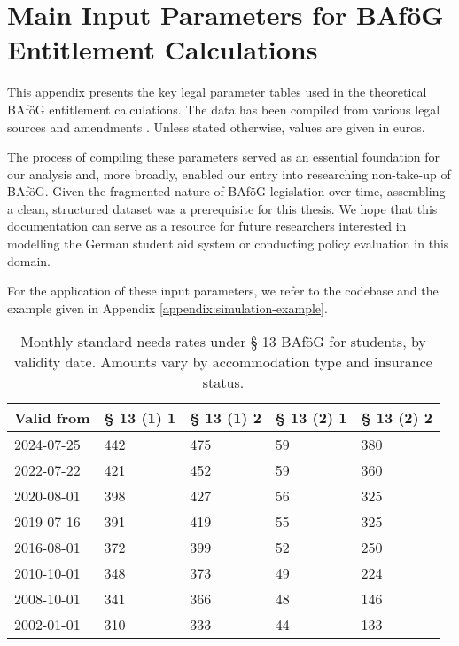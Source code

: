 \newpage
\section{Main Input Parameters for BAföG Entitlement Calculations} \label{appendix:input_params}

This appendix presents the key legal parameter tables used in the theoretical BAföG entitlement calculations. 
The data has been compiled from various legal sources and amendments \cite{bafoeg_law, bafoeg20, bafoeg21, bafoeg22, bafoeg23, bafoeg24, bafoeg25, bafoeg26, bafoeg27, bafoeg28}. 
Unless stated otherwise, values are given in euros.

The process of compiling these parameters served as an essential foundation for our analysis and, more broadly, enabled our entry into researching non-take-up of BAföG. 
Given the fragmented nature of BAföG legislation over time, assembling a clean, structured dataset was a prerequisite for this thesis.
We hope that this documentation can serve as a resource for future researchers interested in modelling the German student aid system or conducting policy evaluation in this domain.

For the application of these input parameters, we refer to the codebase \citep[][version~\texttt{v1.0}]{bystrom2025msc} and the example given in Appendix \ref{appendix:simulation-example}.
\vspace{1em}

\begin{table}[H]
\centering
\small
\begin{tabularx}{\textwidth}{lXXXX}
\toprule
\textbf{Valid from} & \textbf{§ 13 (1) 1} & \textbf{§ 13 (1) 2} & \textbf{§ 13 (2) 1} & \textbf{§ 13 (2) 2} \\
\midrule
2024-07-25 & 442 & 475 & 59 & 380 \\
2022-07-22 & 421 & 452 & 59 & 360 \\
2020-08-01 & 398 & 427 & 56 & 325 \\
2019-07-16 & 391 & 419 & 55 & 325 \\
2016-08-01 & 372 & 399 & 52 & 250 \\
2010-10-01 & 348 & 373 & 49 & 224 \\
2008-10-01 & 341 & 366 & 48 & 146 \\
2002-01-01 & 310 & 333 & 44 & 133 \\
\bottomrule
\end{tabularx}
\caption{Monthly standard needs rates under § 13 BAföG for students, by validity date. Amounts vary by accommodation type and insurance status.}
\label{tab:bafog_values_13}
\end{table}

